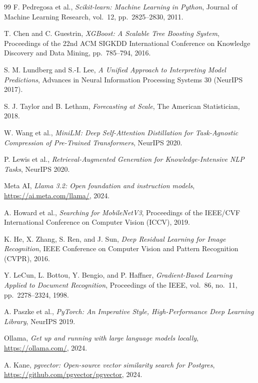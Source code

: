\documentclass[12pt, a4paper, oneside]{report}
\begin{document}
\begin{thebibliography}{99}
F. Pedregosa et al.,
\textit{Scikit-learn: Machine Learning in Python},
Journal of Machine Learning Research, vol.~12, pp.~2825--2830, 2011.

T. Chen and C. Guestrin,
\textit{XGBoost: A Scalable Tree Boosting System},
Proceedings of the 22nd ACM SIGKDD International Conference on
Knowledge Discovery and Data Mining, pp.~785--794, 2016.

S. M. Lundberg and S.-I. Lee,
\textit{A Unified Approach to Interpreting Model Predictions},
Advances in Neural Information Processing Systems 30 (NeurIPS 2017).

S. J. Taylor and B. Letham,
\textit{Forecasting at Scale}, The American Statistician, 2018.

W. Wang et al.,
\textit{MiniLM: Deep Self-Attention Distillation for Task-Agnostic
Compression of Pre-Trained Transformers}, NeurIPS 2020.

P. Lewis et al.,
\textit{Retrieval-Augmented Generation for Knowledge-Intensive NLP
Tasks}, NeurIPS 2020.

Meta AI,
\textit{Llama 3.2: Open foundation and instruction models},
\url{https://ai.meta.com/llama/}, 2024.

A. Howard et al.,
\textit{Searching for MobileNetV3},
Proceedings of the IEEE/CVF International Conference on Computer
Vision (ICCV), 2019.

K. He, X. Zhang, S. Ren, and J. Sun,
\textit{Deep Residual Learning for Image Recognition},
IEEE Conference on Computer Vision and Pattern Recognition (CVPR),
2016.

Y. LeCun, L. Bottou, Y. Bengio, and P. Haffner,
\textit{Gradient-Based Learning Applied to Document Recognition},
Proceedings of the IEEE, vol.~86, no.~11, pp.~2278--2324, 1998.

A. Paszke et al.,
\textit{PyTorch: An Imperative Style, High-Performance Deep Learning
Library}, NeurIPS 2019.

Ollama,
\textit{Get up and running with large language models locally},
\url{https://ollama.com/}, 2024.

A. Kane,
\textit{pgvector: Open-source vector similarity search for Postgres},
\url{https://github.com/pgvector/pgvector}, 2024.


\end{thebibliography}
\end{document}
